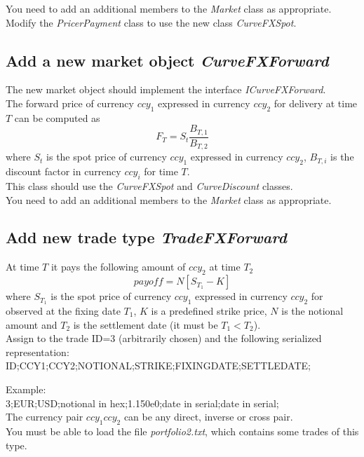 \documentclass[10pt]{article}
\begin{document}
You need to add an additional members to the \textit{Market} class as appropriate.\\

Modify the \textit{PricerPayment} class to use the new class \textit{CurveFXSpot}.

\subsection{Add a new market object \textit{CurveFXForward}}
The new market object should implement the interface \textit{ICurveFXForward}.\\

The forward price of currency $ccy_1$ expressed in currency $ccy_2$ for delivery at time $T$ can be computed as
$$F_T=S_t \frac{B_{T,1}}{B_{T,2}}$$
where $S_t$ is the spot price of currency $ccy_1$ expressed in currency $ccy_2$, $B_{T,i}$ is the discount factor in currency $ccy_i$ for time $T$.\\

This class should use the \textit{CurveFXSpot} and \textit{CurveDiscount} classes.\\

You need to add an additional members to the \textit{Market} class as appropriate.

\subsection{Add new trade type \textit{TradeFXForward}}
At time $T$ it pays the following amount of $ccy_2$ at time $T_2$
$$
payoff=N[S_{T_1}-K]
$$
where $S_{T_1}$ is the spot price of currency $ccy_1$ expressed in currency $ccy_2$ for observed at the fixing date $T_1$, $K$ is a predefined strike price, $N$ is the notional amount and $T_2$ is the settlement date (it must be $T_1<T_2$).\\

Assign to the trade ID=3 (arbitrarily chosen) and the following serialized representation:\\
ID;CCY1;CCY2;NOTIONAL;STRIKE;FIXINGDATE;SETTLEDATE;

\noindent Example:\\
3;EUR;USD;notional in hex;1.150e0;date in serial;date in serial;\\

The currency pair $ccy_1ccy_2$ can be any direct, inverse or cross pair.\\

You must be able to load the file \textit{portfolio2.txt}, which contains some trades of this type.\\
\end{document}
